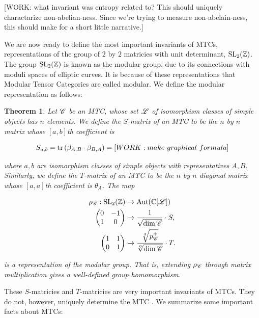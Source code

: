 \documentclass{article}
\newtheorem{theorem}{Theorem}[section]
\theoremstyle{definition}
\numberwithin{figure}{section}
\begin{document}
[WORK: what invariant was entropy related to? This should uniquely charactarize non-abelian-ness. Since we're trying to measure non-abelain-ness, this should make for a short little narrative.]


We are now ready to define the most important invariants of MTCs, representations of the group of $2$ by $2$ matricies with unit determinant, $\mathrm{SL}_2(\mathbb{Z})$. The group $\mathrm{SL}_2(\mathbb{Z})$ is known as the modular group, due to its connections with moduli spaces of elliptic curves. It is because of these representations that Modular Tensor Categories are called modular. We define the modular representation as follows:

\begin{theorem} Let $\mathscr{C}$ be an MTC, whose set $\mathscr{L}$ of isomorphism classes of simple objects has $n$ elements. We define the $S$-matrix of an MTC to be the $n$ by $n$ matrix whose $[a,b]$th coefficient is

$$S_{a,b}=\mathrm{tr}\left(\beta_{A,B}\cdot \beta_{B,A}\right)=[WORK: make \,\, graphical \,\, formula]$$

where $a,b$ are isomorphism classes of simple objects with representatives $A,B$. Similarly, we define the $T$-matrix of an MTC to be the $n$ by $n$ diagonal matrix whose $[a,a]$th coefficient is $\theta_A$. The map

\begin{align*}
\rho_{\mathscr{C}}: \mathrm{SL}_2(\mathbb{Z})&\xrightarrow{} \mathrm{Aut}(\mathbb{C}[\mathscr{L}])\\
\begin{pmatrix}
0 & -1\\
1 & 0
\end{pmatrix}
&\mapsto \frac{1}{\sqrt{\dim \mathscr{C} }}\cdot S, \\
\begin{pmatrix}
1 & 1\\
0 & 1
\end{pmatrix}
&\mapsto \frac{\sqrt[3]{p^+_{\mathscr{C}}}}{\sqrt[6]{\dim \mathscr{C} }}\cdot T.
\end{align*}

is a representation of the modular group. That is, extending $\rho_{\mathscr{C}}$ through matrix multiplication gives a well-defined group homomorphism.
\end{theorem}


These $S$-matricies and $T$-matricies are very important invariants of MTCs. They do not, however, uniquely determine the MTC \cite{mignard2021modular}. We summarize some important facts about MTCs:
\end{document}
